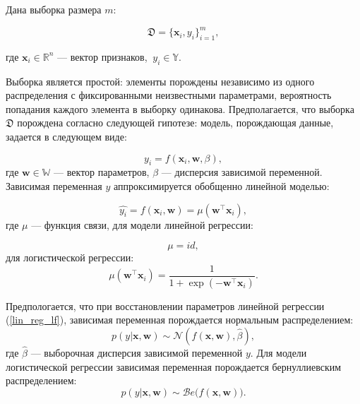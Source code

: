 \documentclass[12pt,twoside]{article}
\begin{document}
Дана выборка размера $m$:

$$
\mathfrak D = \{\mathbf{x}_i, y_i\}_{i=1}^m,
$$

где $\textbf{x}_i \in \mathbb{R}^{n}$ --- вектор признаков, $~y_i \in \mathbb{Y}$.


Выборка является простой: элементы порождены независимо из одного распределения с фиксированными неизвестными параметрами, вероятность попадания каждого элемента в выборку одинакова. Предполагается, что выборка $\mathfrak D$ порождена согласно следующей гипотезе: модель, порождающая данные, задается в следующем виде:

\begin{equation}\label{f}
y_i = f(\mathbf{x}_i, \mathbf{w}, \beta),
\end{equation}
где $\textbf{w} \in \mathbb{W}$ --- вектор параметров, $\beta$ --- дисперсия зависимой переменной. Зависимая переменная $y$ аппроксимируется обобщенно линейной моделью:

\begin{equation}\label{y_f}
\hat{y_i} = f(\mathbf{x}_i, \mathbf{w}) = \mu(\mathbf{w}^{\top}\mathbf{x}_i),
\end{equation}
где $\mu$ --- функция связи, для модели линейной регрессии:

\begin{equation}\label{lin_reg_lf}
 \mu = id,
\end{equation}
для логистической регрессии:
\begin{equation}\label{log_reg_lf}
\mu(\mathbf{w}^{\top}\mathbf{x}_i) = \frac{1}{1 + \exp(-\mathbf{w}^{\top}\mathbf{x}_i)}.
\end{equation}

Предпологается, что при восстановлении параметров линейной регрессии (\ref{lin_reg_lf}), зависимая переменная порождается нормальным распределением:
$$
p(y | \mathbf{x}, \mathbf{w}) \sim \mathcal{N}(f(\mathbf{x}, \mathbf{w}), \hat{\beta}),
$$
где $\hat{\beta}$ --- выборочная дисперсия зависимой переменной $y$. Для модели логистической регрессии зависимая переменная порождается бернуллиевским распределением:
$$
p(y | \mathbf{x}, \mathbf{w}) \sim \mathcal{B}e \bigl( f(\mathbf{x}, \mathbf{w})\bigr).
$$

\end{document}
